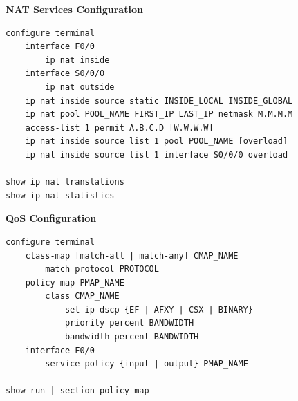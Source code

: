 \documentclass[12pt]{article}
\begin{document}
	\textbf{NAT Services Configuration}
	\begin{lstlisting}
configure terminal
	interface F0/0
		ip nat inside
	interface S0/0/0
		ip nat outside
	ip nat inside source static INSIDE_LOCAL INSIDE_GLOBAL
	ip nat pool POOL_NAME FIRST_IP LAST_IP netmask M.M.M.M
	access-list 1 permit A.B.C.D [W.W.W.W]
	ip nat inside source list 1 pool POOL_NAME [overload]
	ip nat inside source list 1 interface S0/0/0 overload

show ip nat translations
show ip nat statistics
	\end{lstlisting}

	\textbf{QoS Configuration}
	\begin{lstlisting}
configure terminal
	class-map [match-all | match-any] CMAP_NAME
		match protocol PROTOCOL
	policy-map PMAP_NAME
		class CMAP_NAME
			set ip dscp {EF | AFXY | CSX | BINARY}
			priority percent BANDWIDTH
			bandwidth percent BANDWIDTH
	interface F0/0
		service-policy {input | output} PMAP_NAME
		
show run | section policy-map
	\end{lstlisting}
\end{document}
